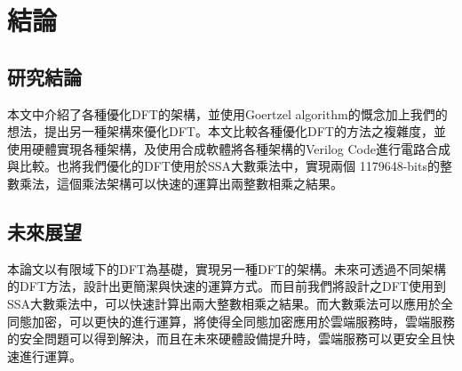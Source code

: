 
\chapter{結論} \label{conclusion_and_future}


\section{研究結論}

本文中介紹了各種優化DFT的架構，並使用Goertzel algorithm的慨念加上我們的想法，提出另一種架構來優化DFT。本文比較各種優化DFT的方法之複雜度，並使用硬體實現各種架構，及使用合成軟體將各種架構的Verilog Code進行電路合成與比較。也將我們優化的DFT使用於SSA大數乘法中，實現兩個 1179648-bits的整數乘法，這個乘法架構可以快速的運算出兩整數相乘之結果。

\section{未來展望}

本論文以有限域下的DFT為基礎，實現另一種DFT的架構。未來可透過不同架構的DFT方法，設計出更簡潔與快速的運算方式。而目前我們將設計之DFT使用到SSA大數乘法中，可以快速計算出兩大整數相乘之結果。而大數乘法可以應用於全同態加密，可以更快的進行運算，將使得全同態加密應用於雲端服務時，雲端服務的安全問題可以得到解決，而且在未來硬體設備提升時，雲端服務可以更安全且快速進行運算。